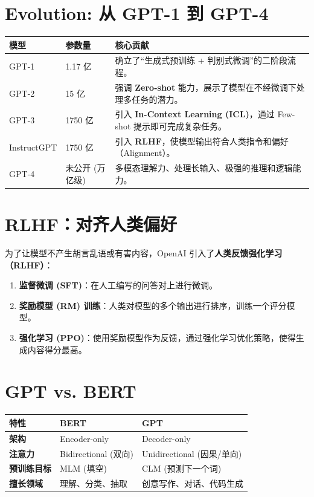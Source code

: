 \documentclass[12pt, a4paper]{book}
\begin{document}
\section{Evolution: 从 GPT-1 到 GPT-4}

\begin{table}[h]
\centering
\begin{tabularx}{\textwidth}{|l|l|X|}
\hline
\textbf{模型} & \textbf{参数量} & \textbf{核心贡献} \\
\hline
GPT-1 & 1.17 亿 & 确立了“生成式预训练 + 判别式微调”的二阶段流程。 \\
\hline
GPT-2 & 15 亿 & 强调 \textbf{Zero-shot} 能力，展示了模型在不经微调下处理多任务的潜力。 \\
\hline
GPT-3 & 1750 亿 & 引入 \textbf{In-Context Learning (ICL)}，通过 Few-shot 提示即可完成复杂任务。 \\
\hline
InstructGPT & 1750 亿 & 引入 \textbf{RLHF}，使模型输出符合人类指令和偏好（Alignment）。 \\
\hline
GPT-4 & 未公开 (万亿级) & 多模态理解力、处理长输入、极强的推理和逻辑能力。 \\
\hline
\end{tabularx}
\end{table}

\section{RLHF：对齐人类偏好}
为了让模型不产生胡言乱语或有害内容，OpenAI 引入了\textbf{人类反馈强化学习（RLHF）}：
\begin{enumerate}
    \item \textbf{监督微调 (SFT)}：在人工编写的问答对上进行微调。
    \item \textbf{奖励模型 (RM) 训练}：人类对模型的多个输出进行排序，训练一个评分模型。
    \item \textbf{强化学习 (PPO)}：使用奖励模型作为反馈，通过强化学习优化策略，使得生成内容得分最高。
\end{enumerate}

\section{GPT vs. BERT}
\begin{table}[h]
\centering
\begin{tabularx}{\textwidth}{|l|X|X|}
\hline
\textbf{特性} & \textbf{BERT} & \textbf{GPT} \\
\hline
\textbf{架构} & Encoder-only & Decoder-only \\
\hline
\textbf{注意力} & Bidirectional (双向) & Unidirectional (因果/单向) \\
\hline
\textbf{预训练目标} & MLM (填空) & CLM (预测下一个词) \\
\hline
\textbf{擅长领域} & 理解、分类、抽取 & 创意写作、对话、代码生成 \\
\hline
\end{tabularx}
\end{table}
\end{document}
